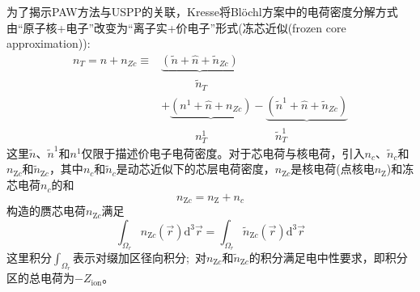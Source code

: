 为了揭示\textrm{PAW}方法与\textrm{USPP}的关联，\textrm{Kresse}将\textrm{Bl\"ochl}方案中的电荷密度分解方式由“原子核+电子”改变为“离子实+价电子”形式(冻芯近似(\textrm{frozen core approximation})):~
\begin{equation}
	\begin{aligned}
		n_T=n+n_{Zc}\equiv&\underbrace{(\tilde n+\hat n+\tilde n_{Zc})}\\
				 		&\quad\qquad\tilde n_T\\
				  &+\underbrace{(n^1+\hat n+n_{Zc})}-\underbrace{(\tilde n^1+\hat n+\tilde n_{Zc})}\\
				                  &\quad\qquad n_T^1\qquad\qquad\qquad\tilde n_T^1
	\end{aligned}
	\label{eq:PAW_Kresse_02}
\end{equation}
这里$\tilde n$、$\tilde n^1$和$n^1$仅限于描述价电子电荷密度。对于芯电荷与核电荷，引入$n_c$、$\tilde n_c$和$n_{\mathrm{Z}c}$和$\tilde n_{\mathrm{Z}c}$，其中$n_c$和$\tilde n_c$是动芯近似下的芯层电荷密度，$n_{\mathrm{Z}c}$是核电荷(点核电$n_{\mathrm Z}$)和冻芯电荷$n_c$的和
\begin{displaymath}
	n_{\mathrm{Z}c}=n_{\mathrm{Z}}+n_c
\end{displaymath}
构造的赝芯电荷$n_{\mathrm{Z}c}$满足
\begin{equation}
	\int_{\Omega_r}n_{\mathrm{Z}c}(\vec r)\mathrm{d}^3\vec r=\int_{\Omega_r}\tilde n_{\mathrm{Z}c}(\vec r)\mathrm{d}^3\vec r
	\label{eq:PAW_Kresse_01}
\end{equation}
这里积分$\int_{\Omega_r}$表示对缀加区径向积分;~对$n_{\mathrm{Z}c}$和$\tilde n_{\mathrm{Z}c}$的积分满足电中性要求，即积分区的总电荷为$-Z_{\mathrm{ion}}$。%

